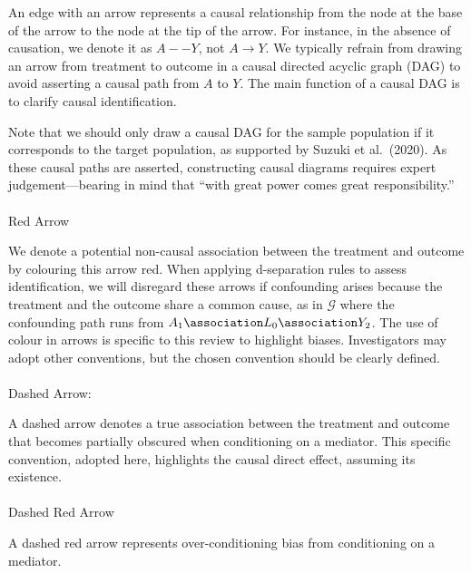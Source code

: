 \documentclass[
  single column]{article}
\makeatletter
\let\oldparagraph\paragraph
\renewcommand{\paragraph}{
    \@ifstar
      \xxxParagraphStar
      \xxxParagraphNoStar
  }
\newcommand{\xxxParagraphStar}[1]{\oldparagraph*{#1}\mbox{}}
\newcommand{\xxxParagraphNoStar}[1]{\oldparagraph{#1}\mbox{}}
\makeatother
\begin{document}
An edge with an arrow represents a causal relationship from the node at
the base of the arrow to the node at the tip of the arrow. For instance,
in the absence of causation, we denote it as \(A -- Y\), not
\(A \rightarrow Y\). We typically refrain from drawing an arrow from
treatment to outcome in a causal directed acyclic graph (DAG) to avoid
asserting a causal path from \(A\) to \(Y\). The main function of a
causal DAG is to clarify causal identification.

Note that we should only draw a causal DAG for the sample population if
it corresponds to the target population, as supported by Suzuki et
al.~(2020). As these causal paths are asserted, constructing causal
diagrams requires expert judgement---bearing in mind that ``with great
power comes great responsibility.''

\paragraph{Red Arrow}\label{red-arrow}

We denote a potential non-causal association between the treatment and
outcome by colouring this arrow red. When applying d-separation rules to
assess identification, we will disregard these arrows if confounding
arises because the treatment and the outcome share a common cause, as in
\(\mathcal{G}\) where the confounding path runs from
\(A_1 \association L_0 \association Y_2\). The use of colour in arrows
is specific to this review to highlight biases. Investigators may adopt
other conventions, but the chosen convention should be clearly defined.

\paragraph{Dashed Arrow:}\label{dashed-arrow}

A dashed arrow denotes a true association between the treatment and
outcome that becomes partially obscured when conditioning on a mediator.
This specific convention, adopted here, highlights the causal direct
effect, assuming its existence.

\paragraph{Dashed Red Arrow}\label{dashed-red-arrow}

A dashed red arrow represents over-conditioning bias from conditioning
on a mediator.
\end{document}
